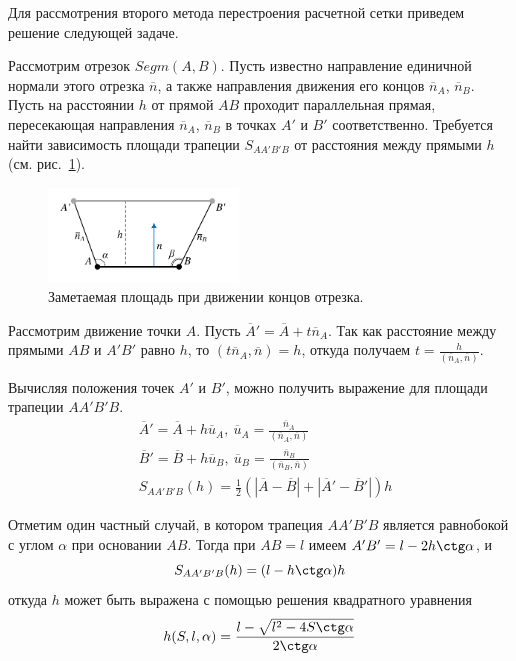 Для рассмотрения второго метода перестроения расчетной сетки приведем решение следующей задаче.

Рассмотрим отрезок $Segm(A, B)$.
Пусть известно направление единичной нормали этого отрезка $\overline{n}$, а также направления движения его концов $\overline{n}_A$, $\overline{n}_B$.
Пусть на расстоянии $h$ от прямой $AB$ проходит параллельная прямая, пересекающая направления $\overline{n}_A$, $\overline{n}_B$ в точках $A'$ и $B'$ соответственно.
Требуется найти зависимость площади трапеции $S_{AA'B'B}$ от расстояния между прямыми $h$ (см. рис.~\ref{fig:text_1_geo_prim_trapezoid_partial}).

\begin{figure}[ht]
\centering
\includegraphics[width=0.45\textwidth]{fig/2dr_trapezoid_partial.pdf}
\singlespacing
{}\caption{Заметаемая площадь при движении концов отрезка.}
\label{fig:text_1_geo_prim_trapezoid_partial}
\end{figure}

Рассмотрим движение точки $A$.
Пусть $\overline{A}' = \overline{A} + t \overline{n}_A$.
Так как расстояние между прямыми $AB$ и $A'B'$ равно $h$, то $(t \overline{n}_A, \overline{n}) = h$, откуда получаем $t = \frac{h}{(\overline{n}_A, \overline{n})}$.

Вычисляя положения точек $A'$ и $B'$, можно получить выражение для площади трапеции $AA'B'B$.
\begin{equation}\label{eqn:text_1_geo_prim_aa1b1b}
	\begin{aligned}
		& \overline{A}' = \overline{A} + h \overline{u}_A, \ \overline{u}_A = \frac{\overline{n}_A}{(\overline{n}_A, \overline{n})} \\
		& \overline{B}' = \overline{B} + h \overline{u}_B, \ \overline{u}_B = \frac{\overline{n}_B}{(\overline{n}_B, \overline{n})} \\
		& S_{AA'B'B}(h) = \frac{1}{2} \left( |\overline{A} - \overline{B}| + |\overline{A}' - \overline{B}'| \right) h
	\end{aligned}
\end{equation}

Отметим один частный случай, в котором трапеция $AA'B'B$ является равнобокой с углом $\alpha$ при основании $AB$.
Тогда при $AB = l$ имеем $A'B' = l - 2 h \ctg \alpha$, и
\begin{equation}
	S_{AA'B'B}(h) = (l - h \ctg \alpha) h
\end{equation}
откуда $h$ может быть выражена с помощью решения квадратного уравнения
\begin{equation}\label{eqn:text_1_geo_prim_trapezium_h_from_s}
	h(S, l, \alpha) = \frac{l - \sqrt{l^2 - 4 S \ctg \alpha}}{2 \ctg \alpha}
\end{equation}


